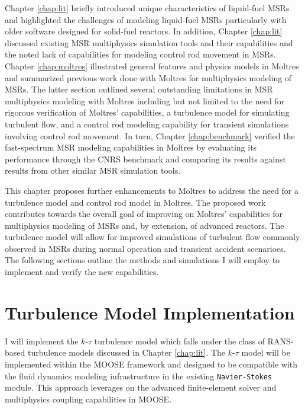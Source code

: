 Chapter \ref{chap:lit} briefly introduced unique characteristics of liquid-fuel
\glspl{MSR}
and highlighted the challenges of modeling liquid-fuel \glspl{MSR} particularly
with older software designed for solid-fuel reactors. In addition, Chapter
\ref{chap:lit} discussed existing \gls{MSR} multiphysics simulation tools and
their capabilities and the noted lack of capabilities for modeling control rod
movement in \glspl{MSR}. Chapter \ref{chap:moltres} illustrated general
features and physics models in Moltres and summarized previous work done with
Moltres for multiphysics modeling of \glspl{MSR}. The latter section outlined
several outstanding limitations in \gls{MSR} multiphysics modeling with
Moltres including but not limited to the need for rigorous verification of
Moltres' capabilities, a turbulence model for simulating turbulent flow, and a
control rod modeling capability for transient simulations involving control rod
movement. In turn, Chapter \ref{chap:benchmark} verified the fast-spectrum
\gls{MSR} modeling capabilities in Moltres by evaluating its performance
through the CNRS benchmark and comparing its results against results from other
similar \gls{MSR} simulation tools.

This chapter proposes further enhancements to Moltres to address the
need for a turbulence model and control rod model in Moltres. The proposed work
contributes towards the overall goal of improving on Moltres' capabilities for
multiphysics modeling of \glspl{MSR} and, by extension, of advanced reactors.
The turbulence model will allow for improved simulations of turbulent flow
commonly observed in \glspl{MSR} during normal operation and transient accident
scenarioes. The following sections outline the methods and simulations I will
employ to implement and verify the new capabilities.

\section{Turbulence Model Implementation}

I will implement the $k$-$\tau$ turbulence model which falls under the class of
\gls{RANS}-based turbulence models discussed in Chapter \ref{chap:lit}. The
$k$-$\tau$ model will be implemented within the \gls{MOOSE} framework and
designed to be compatible with the fluid dynamics modeling infrastructure in
the existing \texttt{Navier-Stokes} module. This approach leverages on the
advanced finite-element solver and multiphysics coupling capabilities in
\gls{MOOSE}.

